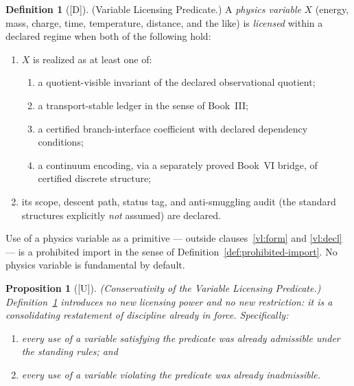 \documentclass[12pt,oneside]{amsbook}
\theoremstyle{plain}
\newtheorem{proposition}[theorem]{Proposition}
\theoremstyle{definition}
\newtheorem{definition}[theorem]{Definition}
\theoremstyle{remark}
\newcommand{\status}[1]{\textup{[#1]}}
\begin{document}
\begin{definition}[\status{D}]\label{def:variable-licensing}
\textup{(Variable Licensing Predicate.)}
A \emph{physics variable} $X$ (energy, mass, charge, time,
temperature, distance, and the like) is \emph{licensed} within a
declared regime when both of the following hold:
\begin{enumerate}[label=\textup{(\alph*)}]
  \item\label{vl:form} $X$ is realized as at least one of:
  \begin{enumerate}[label=\textup{(\roman*)}]
    \item a quotient-visible invariant of the declared
          observational quotient;
    \item a transport-stable ledger in the sense of Book~III;
    \item a certified branch-interface coefficient with declared
          dependency conditions;
    \item a continuum encoding, via a separately proved Book~VI
          bridge, of certified discrete structure;
  \end{enumerate}
  \item\label{vl:decl} its scope, descent path, status tag, and
        anti-smuggling audit (the standard structures explicitly
        \emph{not} assumed) are declared.
\end{enumerate}
Use of a physics variable as a primitive --- outside
clauses~\ref{vl:form} and \ref{vl:decl} --- is a prohibited import
in the sense of Definition~\ref{def:prohibited-import}.  No physics
variable is fundamental by default.
\end{definition}

\begin{proposition}[\status{U}]\label{prop:variable-licensing-conservative}
\textup{(Conservativity of the Variable Licensing Predicate.)}
Definition~\ref{def:variable-licensing} introduces no new licensing
power and no new restriction: it is a consolidating restatement of
discipline already in force.  Specifically:
\begin{enumerate}[label=\textup{(\arabic*)}]
  \item every use of a variable satisfying the predicate was
        already admissible under the standing rules; and
  \item every use of a variable violating the predicate was
        already inadmissible.
\end{enumerate}
\end{proposition}
\end{document}
